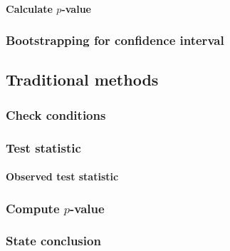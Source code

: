 \documentclass[12pt, krantz2,]{krantz}
\let\oldparagraph\paragraph
\renewcommand{\paragraph}[1]{\oldparagraph{#1}\mbox{}}
\begin{document}
\hypertarget{calculate-p-value-4}{%
\paragraph{\texorpdfstring{Calculate \(p\)-value}{Calculate p-value}}\label{calculate-p-value-4}}

\hypertarget{bootstrapping-for-confidence-interval-4}{%
\subsubsection*{Bootstrapping for confidence interval}\label{bootstrapping-for-confidence-interval-4}}


\hypertarget{traditional-methods-4}{%
\subsection{Traditional methods}\label{traditional-methods-4}}

\hypertarget{check-conditions-4}{%
\subsubsection*{Check conditions}\label{check-conditions-4}}


\hypertarget{test-statistic-4}{%
\subsubsection*{Test statistic}\label{test-statistic-4}}


\hypertarget{observed-test-statistic-4}{%
\paragraph{Observed test statistic}\label{observed-test-statistic-4}}

\hypertarget{compute-p-value-2}{%
\subsubsection*{\texorpdfstring{Compute \(p\)-value}{Compute p-value}}\label{compute-p-value-2}}


\hypertarget{state-conclusion-4}{%
\subsubsection*{State conclusion}\label{state-conclusion-4}}
\end{document}
